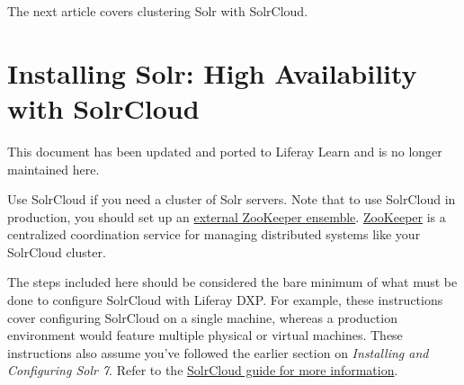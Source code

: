 The next article covers clustering Solr with SolrCloud.

\chapter{Installing Solr: High Availability with
SolrCloud}\label{installing-solr-high-availability-with-solrcloud}

{This document has been updated and ported to Liferay Learn and is no
longer maintained here.}

Use SolrCloud if you need a cluster of Solr servers. Note that to use
SolrCloud in production, you should set up an
\href{https://cwiki.apache.org/confluence/display/solr/Setting+Up+an+External+ZooKeeper+Ensemble}{external
ZooKeeper ensemble}. \href{http://zookeeper.apache.org/}{ZooKeeper} is a
centralized coordination service for managing distributed systems like
your SolrCloud cluster.

The steps included here should be considered the bare minimum of what
must be done to configure SolrCloud with Liferay DXP. For example, these
instructions cover configuring SolrCloud on a single machine, whereas a
production environment would feature multiple physical or virtual
machines. These instructions also assume you've followed the earlier
section on \emph{Installing and Configuring Solr 7}. Refer to the
\href{https://cwiki.apache.org/confluence/display/solr/SolrCloud}{SolrCloud
guide for more information}.

